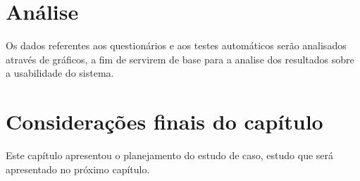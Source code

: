 
\section{Análise}

Os dados referentes aos questionários e aos testes automáticos serão analisados através de gráficos, a fim de servirem de base para a analise dos resultados sobre a usabilidade do sistema.

\section{Considerações finais do capítulo}

Este capítulo apresentou o planejamento do estudo de caso, estudo que será apresentado no próximo capítulo.
